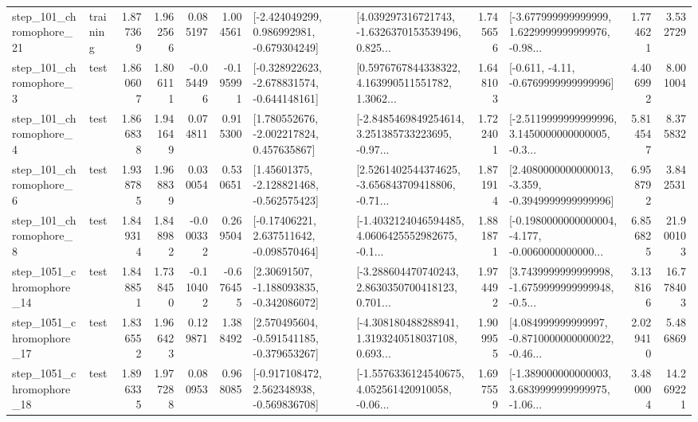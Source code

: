 \begin{tabular}{llrrrrllrlrr}
  step\_101\_chromophore\_21 &  training &      1.877369 &    1.962566 &      0.085197 &  1.004561 &   [-2.424049299, 0.986992981, -0.679304249] &  [4.039297316721743, -1.6326370153539496, 0.825... &       1.745656 &  [-3.677999999999999, 1.6229999999999976, -0.98... &            1.774621 &          3.532729 \\
   step\_101\_chromophore\_3 &      test &      1.860607 &    1.806111 &     -0.054496 & -0.195991 &  [-0.328922623, -2.678831574, -0.644148161] &  [0.5976767844338322, 4.163990511551782, 1.3062... &       1.648103 &               [-0.611, -4.11, -0.6769999999999996] &            4.406992 &          8.001004 \\
   step\_101\_chromophore\_4 &      test &      1.866838 &    1.941649 &      0.074811 &  0.915300 &    [1.780552676, -2.002217824, 0.457635867] &  [-2.8485469849254614, 3.251385733223695, -0.97... &       1.722401 &  [-2.5119999999999996, 3.1450000000000005, -0.3... &            5.814547 &          8.375832 \\
   step\_101\_chromophore\_6 &      test &      1.938785 &    1.968839 &      0.030054 &  0.530651 &    [1.45601375, -2.128821468, -0.562575423] &  [2.5261402544374625, -3.656843709418806, -0.71... &       1.871914 &  [2.4080000000000013, -3.359, -0.3949999999999996] &            6.958792 &          3.842531 \\
   step\_101\_chromophore\_8 &      test &      1.849314 &    1.848982 &     -0.000332 &  0.269504 &    [-0.17406221, 2.637511642, -0.098570464] &  [-1.4032124046594485, 4.0606425552982675, -0.1... &       1.881871 &  [-0.1980000000000004, -4.177, -0.0060000000000... &            6.856825 &         21.900103 \\
 step\_1051\_chromophore\_14 &      test &      1.848851 &    1.738450 &     -0.110402 & -0.676455 &    [2.30691507, -1.188093835, -0.342086072] &  [-3.288604470740243, 2.8630350700418123, 0.701... &       1.974492 &  [3.7439999999999998, -1.6759999999999948, -0.5... &            3.138166 &         16.778403 \\
 step\_1051\_chromophore\_17 &      test &      1.836552 &    1.966423 &      0.129871 &  1.388492 &   [2.570495604, -0.591541185, -0.379653267] &  [-4.308180488288941, 1.3193240518037108, 0.693... &       1.909955 &  [4.084999999999997, -0.8710000000000022, -0.46... &            2.029410 &          5.486869 \\
 step\_1051\_chromophore\_18 &      test &      1.896335 &    1.977288 &      0.080953 &  0.968085 &   [-0.917108472, 2.562348938, -0.569836708] &  [-1.5576336124540675, 4.052561420910058, -0.06... &       1.697559 &  [-1.389000000000003, 3.6839999999999975, -1.06... &            3.480004 &         14.269221 \\

\end{tabular}
